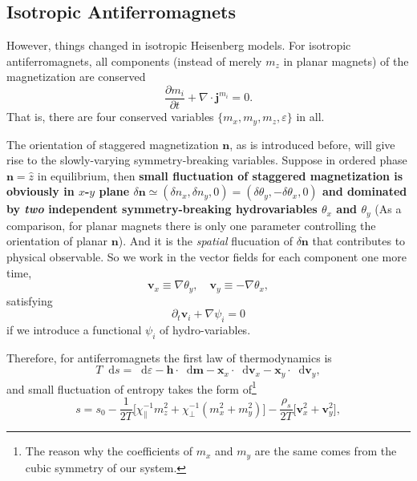 \documentclass[10pt,nofootinbib]{revtex4}
\newcommand*\dd{\mathop{}\!\mathrm{d}}
\begin{document}
	\subsection{Isotropic Antiferromagnets}
		However, things changed in isotropic Heisenberg models. For isotropic antiferromagnets, all components (instead of merely $m_z$ in planar magnets) of the magnetization are conserved
		\begin{equation}\label{2.5.1}
			\dfrac{\partial m_i}{\partial t}+\nabla\cdot\bm{j}^{m_i}=0.
		\end{equation}
		That is, there are four conserved variables $\{m_x,m_y,m_z,\varepsilon\}$ in all.\par
		The orientation of staggered magnetization $\bm{n}$, as is introduced before, will give rise to the slowly-varying symmetry-breaking variables. Suppose in ordered phase $\bm{n}=\hat{z}$ in equilibrium, then \textbf{small fluctuation of staggered magnetization is obviously in $x$-$y$ plane $\delta\bm{n}\simeq(\delta n_x,\delta n_y,0)=(\delta\theta_y,-\delta\theta_x,0)$ and dominated by \emph{two} independent symmetry-breaking hydrovariables $\theta_x$ and $\theta_y$} (As a comparison, for planar magnets there is only one parameter controlling the orientation of planar $\bm{n}$). And it is the \emph{spatial} flucuation of $\delta\bm{n}$ that contributes to physical observable. So we work in the vector fields for each component one more time,
		\begin{equation*}
			\bm{v}_x\equiv\nabla\theta_y,\quad \bm{v}_y\equiv-\nabla\theta_x,
		\end{equation*}
		satisfying
		\begin{equation}\label{2.5.2}
			\partial_t\bm{v}_i+\nabla\psi_i=0
		\end{equation}
		if we introduce a functional $\psi_i$ of hydro-variables.\par
		Therefore, for antiferromagnets the first law of thermodynamics is
		\begin{equation}\label{2.5.3}
			T\dd s=\dd \varepsilon-\bm{h}\cdot\dd\bm{m}-\bm{x}_x\cdot\dd\bm{v}_x-\bm{x}_y\cdot\dd\bm{v}_y,
		\end{equation}
		and small fluctuation of entropy takes the form of\footnote{The reason why the coefficients of $m_x$ and $m_y$ are the same comes from the cubic symmetry of our system.}
		\begin{equation}\label{2.5.4}
			s=s_0-\dfrac{1}{2T}\bigg[\chi_\parallel^{-1}m_z^2+\chi_\perp^{-1}(m_x^2+m_y^2)\bigg]-\dfrac{\rho_s}{2T}\bigg[\bm{v}_x^2+\bm{v}_y^2\bigg],
		\end{equation}
\end{document}
